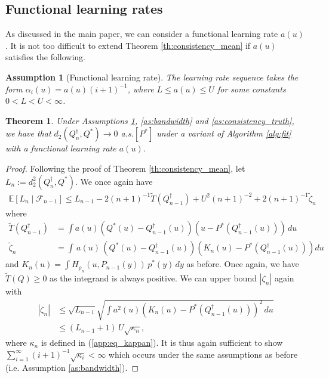 \documentclass[11pt,a4paper]{article}
\newtheorem{thm}{Theorem}
\newtheorem{as}{Assumption}
\newcommand{\E}{\mathbb{E}}
\begin{document}
\begin{appendices}
\subsection{Functional learning rates}\label{app:sec_func}
As discussed in the main paper, we can consider a functional learning rate $a(u)$. It is not too difficult to extend {Theorem \ref{th:consistency_mean}} if $a(u)$ satisfies the following.
\begin{as}[Functional learning rate]\label{as:alpha_func}
    The learning rate sequence takes the form $\alpha_i(u)= a(u)(i+1)^{-1}$, where
 $L \leq a(u) \leq U$ for some constants $0 < L < U < \infty$. 
\end{as}
\begin{thm}
   Under {Assumptions  \ref{as:alpha_func}}, {\ref{as:bandwidth}} and {\ref{as:consistency_truth}}, we have that $d_2( Q_n^{\dagger},Q^*) \to 0$ a.s.$[P^*]$ under a variant of {Algorithm \ref{alg:fit}} with a functional learning rate $a(u)$.
\end{thm}
\begin{proof}
    Following the proof of {Theorem \ref{th:consistency_mean}}, let $L_n := d_2^2(Q_n^{\dagger},Q^*)$. We once again have
    \begin{align}\label{app:eq_asmart_func}
        \E\left[L_n \mid \mathcal{F}_{n-1}\right] \leq L_{n-1} - 2(n+1)^{-1}\widetilde{T}(Q_{n-1}^{\dagger}) + U^2 (n+1)^{-2}+ 2 (n+1)^{-1} \widetilde{\zeta}_n
    \end{align}
    where
    \begin{align*}
         \widetilde{T}(Q^{\dagger}_{n-1}) &= \int a(u) \left(Q^*(u) - Q^\dagger_{n-1}(u)\right)\left(u- P^*\left(Q^{\dagger}_{n-1}(u)\right)\right)\, du\\
         \widetilde{\zeta}_n &=\int \, a(u)\,  \left(Q^*(u) - Q^\dagger_{n-1}(u)\right)\left( K_n(u) - P^*\left(Q_{n-1}^{\dagger}(u)\right)\right)du
    \end{align*}
    and $K_n(u) = \int  H_{\rho_n}(u,P_{n-1}(y))\, p^*(y) \, dy$ as before.
Once again, we have $\widetilde{T}(Q) \geq 0$ as the integrand is always positive. We can upper bound $|\zeta_n|$ again with
\begin{align*}
    |\zeta_n| &\leq \sqrt{L_{n-1}} \sqrt{\int a^2(u) \left(K_n(u) - P^*\left(Q_{n-1}^{\dagger}(u)\right)\right)^2 \, du}\\
    &\leq (L_{n-1} +1)\,  U \sqrt{\kappa_n},
\end{align*}
where $\kappa_n$ is defined in (\ref{app:eq_kappan}). It is thus again sufficient to show $\sum_{i=1}^\infty (i+1)^{-1}\sqrt{\kappa_i} < \infty$ which occurs under the same assumptions as before (i.e. {Assumption \ref{as:bandwidth}}).


\end{proof}
\end{appendices}
\end{document}
